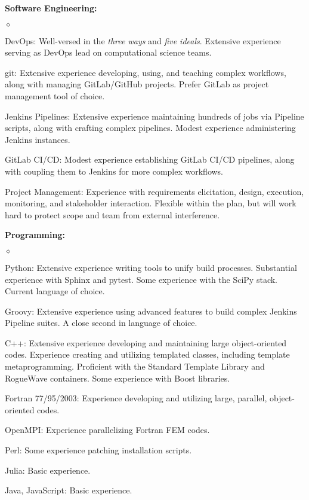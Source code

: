 \documentclass[margin,line,pifont,palatino,10pt]{res}
\begin{document}
\begin{resume}
{\bf Software Engineering:}
\begin{list}{$\diamond$}{\leftmargin=0.15in}
	\item DevOps:  Well-versed in the \emph{three ways} and \emph{five ideals}.  Extensive experience serving as DevOps lead on computational science teams.
	\item git:  Extensive experience developing, using, and teaching complex workflows, along with managing GitLab/GitHub projects.  Prefer GitLab as project management tool of choice.
	\item Jenkins Pipelines:  Extensive experience maintaining hundreds of jobs via Pipeline scripts, along with crafting complex pipelines.  Modest experience administering Jenkins instances.
	\item GitLab CI/CD:  Modest experience establishing GitLab CI/CD pipelines, along with coupling them to Jenkins for more complex workflows.
	\item Project Management:  Experience with requirements elicitation, design, execution, monitoring, and stakeholder interaction.  Flexible within the plan, but will work hard to protect scope and team from external interference.
\end{list}
{\bf Programming:}
\begin{list}{$\diamond$}{\leftmargin=0.15in}
	\item Python:  Extensive experience writing tools to unify build processes.  Substantial experience with Sphinx and pytest.  Some experience with the SciPy stack.  Current language of choice.
	\item Groovy:  Extensive experience using advanced features to build complex Jenkins Pipeline suites.  A close second in language of choice.
	\item C++:  Extensive experience developing and maintaining large object-oriented codes.  Experience creating and utilizing templated classes, including template metaprogramming.  Proficient with the Standard Template Library and RogueWave containers.  Some experience with Boost libraries.
	\item Fortran 77/95/2003:  Experience developing and utilizing large, parallel, object-oriented codes.
	\item OpenMPI:  Experience parallelizing Fortran FEM codes.
	\item Perl:  Some experience patching installation scripts.
	\item Julia:  Basic experience.
	\item Java, JavaScript:  Basic experience.

\end{list}
\end{resume}
\end{document}
